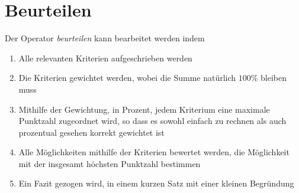 \documentclass{article}
\begin{document}
\section{Beurteilen}
Der Operator \emph{beurteilen} kann bearbeitet werden indem
\begin{enumerate}
 \item Alle relevanten Kriterien aufgeschrieben werden
 \item Die Kriterien gewichtet werden, wobei die Summe natürlich $100\%$ bleiben muss
 \item Mithilfe der Gewichtung, in Prozent, jedem Kriterium eine maximale Punktzahl zugeordnet wird, so dass es sowohl einfach zu rechnen als auch prozentual gesehen korrekt gewichtet ist 
 \item Alle Möglichkeiten mithilfe der Kriterien bewertet werden, die Möglichkeit mit der insgesamt höchsten Punktzahl bestimmen
 \item Ein Fazit gezogen wird, in einem kurzen Satz mit einer kleinen Begründung 
\end{enumerate} 
\end{document}
